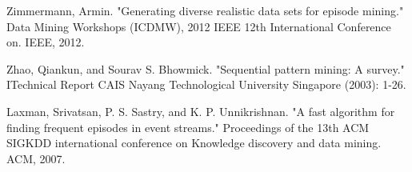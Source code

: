 \begin{thebibliography}{1}
Zimmermann, Armin. "Generating diverse realistic data sets for episode mining." Data Mining Workshops (ICDMW), 2012 IEEE 12th International Conference on. IEEE, 2012.

Zhao, Qiankun, and Sourav S. Bhowmick. "Sequential pattern mining: A survey." ITechnical Report CAIS Nayang Technological University Singapore (2003): 1-26.

Laxman, Srivatsan, P. S. Sastry, and K. P. Unnikrishnan. "A fast algorithm for finding frequent episodes in event streams." Proceedings of the 13th ACM SIGKDD international conference on Knowledge discovery and data mining. ACM, 2007.

\end{thebibliography}